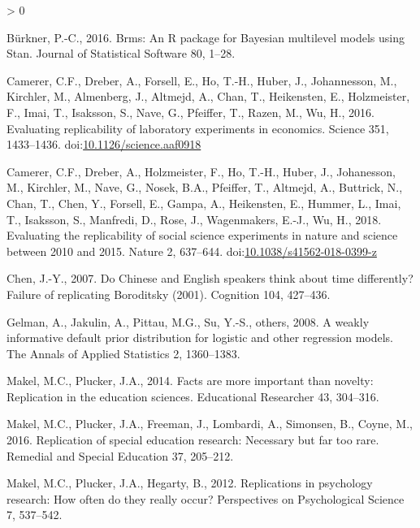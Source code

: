 \documentclass[]{elsarticle} %
\newlength{\cslhangindent}
\newenvironment{CSLReferences}[2] %
 {%
  \setlength{\parindent}{0pt}
  \ifodd #1 \everypar{\setlength{\hangindent}{\cslhangindent}}\ignorespaces\fi
  \ifnum #2 > 0
  \setlength{\parskip}{#2\baselineskip}
  \fi
 }%
 {}
\begin{document}
\hypertarget{refs}{}
\begin{CSLReferences}{1}{0}
\leavevmode\hypertarget{ref-burkner_brms_2016}{}%
Bürkner, P.-C., 2016. Brms: {An} {R} package for {Bayesian} multilevel
models using {Stan}. Journal of Statistical Software 80, 1--28.

\leavevmode\hypertarget{ref-camerer_economics_2016}{}%
Camerer, C.F., Dreber, A., Forsell, E., Ho, T.-H., Huber, J.,
Johannesson, M., Kirchler, M., Almenberg, J., Altmejd, A., Chan, T.,
Heikensten, E., Holzmeister, F., Imai, T., Isaksson, S., Nave, G.,
Pfeiffer, T., Razen, M., Wu, H., 2016. Evaluating replicability of
laboratory experiments in economics. Science 351, 1433--1436.
doi:\href{https://doi.org/10.1126/science.aaf0918}{10.1126/science.aaf0918}

\leavevmode\hypertarget{ref-camerer_socscience_2018}{}%
Camerer, C.F., Dreber, A., Holzmeister, F., Ho, T.-H., Huber, J.,
Johanesson, M., Kirchler, M., Nave, G., Nosek, B.A., Pfeiffer, T.,
Altmejd, A., Buttrick, N., Chan, T., Chen, Y., Forsell, E., Gampa, A.,
Heikensten, E., Hummer, L., Imai, T., Isaksson, S., Manfredi, D., Rose,
J., Wagenmakers, E.-J., Wu, H., 2018. Evaluating the replicability of
social science experiments in nature and science between 2010 and 2015.
Nature 2, 637--644.
doi:\href{https://doi.org/10.1038/s41562-018-0399-z}{10.1038/s41562-018-0399-z}

\leavevmode\hypertarget{ref-chen_chinese_2007}{}%
Chen, J.-Y., 2007. Do {Chinese} and {English} speakers think about time
differently? {Failure} of replicating {Boroditsky} (2001). Cognition
104, 427--436.

\leavevmode\hypertarget{ref-gelman_weakly_2008}{}%
Gelman, A., Jakulin, A., Pittau, M.G., Su, Y.-S., others, 2008. A weakly
informative default prior distribution for logistic and other regression
models. The Annals of Applied Statistics 2, 1360--1383.

\leavevmode\hypertarget{ref-makel2014facts}{}%
Makel, M.C., Plucker, J.A., 2014. Facts are more important than novelty:
Replication in the education sciences. Educational Researcher 43,
304--316.

\leavevmode\hypertarget{ref-makel_replications_2016}{}%
Makel, M.C., Plucker, J.A., Freeman, J., Lombardi, A., Simonsen, B.,
Coyne, M., 2016. Replication of special education research: Necessary
but far too rare. Remedial and Special Education 37, 205--212.

\leavevmode\hypertarget{ref-makel_replications_2012}{}%
Makel, M.C., Plucker, J.A., Hegarty, B., 2012. Replications in
psychology research: {How} often do they really occur? Perspectives on
Psychological Science 7, 537--542.


\end{CSLReferences}
\end{document}
